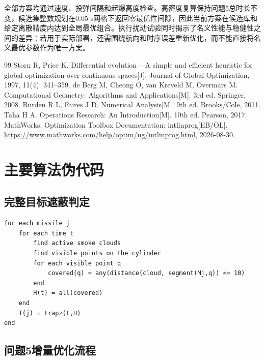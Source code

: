 \documentclass[12pt,a4paper]{ctexart}
\begin{document}
全部方案均通过速度、投弹间隔和起爆高度检查。高密度复算保持问题5总时长不变，候选集整数规划在0.05 s网格下返回零最优性间隙，因此当前方案在候选库和给定离散精度内达到全局最优组合。执行扰动试验同时揭示了名义性能与稳健性之间的差异：若用于实际部署，还需围绕航向和时序误差重新优化，而不能直接将名义最优参数作为唯一方案。

\begin{thebibliography}{99}
\footnotesize
\setlength{\itemsep}{0pt}
 Storn R, Price K. Differential evolution -- A simple and efficient heuristic for global optimization over continuous spaces[J]. Journal of Global Optimization, 1997, 11(4): 341--359.
 de Berg M, Cheong O, van Kreveld M, Overmars M. Computational Geometry: Algorithms and Applications[M]. 3rd ed. Springer, 2008.
 Burden R L, Faires J D. Numerical Analysis[M]. 9th ed. Brooks/Cole, 2011.
 Taha H A. Operations Research: An Introduction[M]. 10th ed. Pearson, 2017.
 MathWorks. Optimization Toolbox Documentation: intlinprog[EB/OL]. \url{https://www.mathworks.com/help/optim/ug/intlinprog.html}, 2026-08-30.
\end{thebibliography}
\normalsize

\appendix
{}
\section{主要算法伪代码}

\subsection{完整目标遮蔽判定}

\begin{lstlisting}
for each missile j
    for each time t
        find active smoke clouds
        find visible points on the cylinder
        for each visible point q
            covered(q) = any(distance(cloud, segment(Mj,q)) <= 10)
        end
        H(t) = all(covered)
    end
    T(j) = trapz(t,H)
end
\end{lstlisting}

\subsection{问题5增量优化流程}
\end{document}
